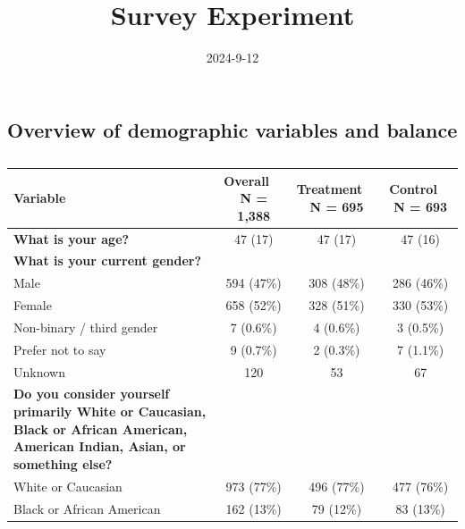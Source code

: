 \documentclass[
  11pt,
  a4paper,
]{article}
\title{Survey Experiment}
\date{2024-9-12}
\author{\sf{\Large\textbf{Isaiah} \\[0.5cm]}}
\makeatletter
\def\maketitle{\front{\expandafter{\@title}}{\@author}{\@organization}}
\makeatother
\begin{document}
\maketitle


\subsection{Overview of demographic variables and
balance}\label{overview-of-demographic-variables-and-balance}

\begingroup\fontsize{12}{14}\selectfont

\begin{longtable}[l]{lccc}

\caption{\label{tbl-1}}

\tabularnewline

\toprule
\textbf{Variable} & \makecell[c]{\textbf{Overall}\ \ \\N = 1,388} & \makecell[c]{\textbf{Treatment}\ \ \\N = 695} & \makecell[c]{\textbf{Control}\ \ \\N = 693}\\
\midrule
\textbf{What is your age?} & 47 (17) & 47 (17) & 47 (16)\\
\textbf{What is your current gender?} &  &  & \\
\hspace{1em}Male & 594 (47\%) & 308 (48\%) & 286 (46\%)\\
\hspace{1em}Female & 658 (52\%) & 328 (51\%) & 330 (53\%)\\
\hspace{1em}Non-binary / third gender & 7 (0.6\%) & 4 (0.6\%) & 3 (0.5\%)\\
\addlinespace
\hspace{1em}Prefer not to say & 9 (0.7\%) & 2 (0.3\%) & 7 (1.1\%)\\
\hspace{1em}Unknown & 120 & 53 & \vphantom{4} 67\\
\textbf{Do you consider yourself primarily White or Caucasian, Black or African American, American Indian, Asian, or something else?} &  &  & \\
\hspace{1em}White or Caucasian & 973 (77\%) & 496 (77\%) & 477 (76\%)\\
\hspace{1em}Black or African American & 162 (13\%) & 79 (12\%) & 83 (13\%)\\

\end{longtable}
\end{document}
